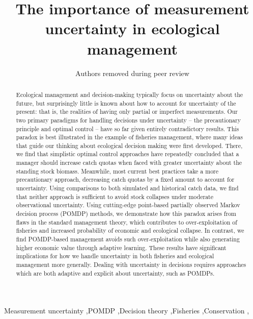 \documentclass[3p]{elsarticle} %
\begin{document}
\begin{frontmatter}

  \title{The importance of measurement uncertainty in ecological management}
    \author[]{Authors removed during peer review}
  
  
    
  \begin{abstract}
  Ecological management and decision-making typically focus on uncertainty
  about the future, but surprisingly little is known about how to account
  for uncertainty of the present: that is, the realities of having only
  partial or imperfect measurements. Our two primary paradigms for
  handling decisions under uncertainty -- the precautionary principle and
  optimal control -- have so far given entirely contradictory results.
  This paradox is best illustrated in the example of fisheries management,
  where many ideas that guide our thinking about ecological decision
  making were first developed. There, we find that simplistic optimal
  control approaches have repeatedly concluded that a manager should
  increase catch quotas when faced with greater uncertainty about the
  standing stock biomass. Meanwhile, most current best practices take a
  more precautionary approach, decreasing catch quotas by a fixed amount
  to account for uncertainty. Using comparisons to both simulated and
  historical catch data, we find that neither approach is sufficient to
  avoid stock collapses under moderate observational uncertainty. Using
  cutting-edge point-based partially observed Markov decision process
  (POMDP) methods, we demonstrate how this paradox arises from flaws in
  the standard management theory, which contributes to over-exploitation
  of fisheries and increased probability of economic and ecological
  collapse. In contrast, we find POMDP-based management avoids such
  over-exploitation while also generating higher economic value through
  adaptive learning. These results have significant implications for how
  we handle uncertainty in both fisheries and ecological management more
  generally. Dealing with uncertainty in decisions requires approaches
  which are both adaptive and explicit about uncertainty, such as POMDPs.
  \end{abstract}
   \begin{keyword} Measurement uncertainty \sep POMDP \sep Decision theory \sep Fisheries \sep Conservation \sep \end{keyword}
 \end{frontmatter}
\end{document}
